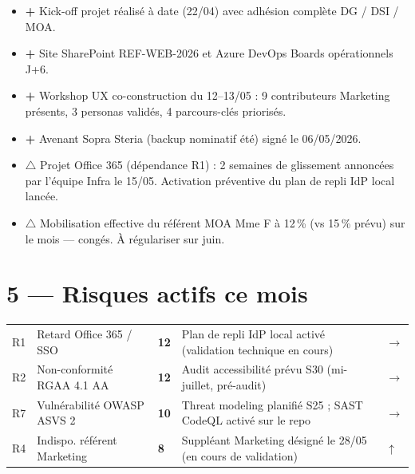 \documentclass[11pt,a4paper,oneside]{report}
\begin{document}
\begin{itemize}
  \item \textbf{+} Kick-off projet réalisé à date (22/04) avec adhésion complète DG / DSI / MOA.
  \item \textbf{+} Site SharePoint REF-WEB-2026 et Azure DevOps Boards opérationnels J+6.
  \item \textbf{+} Workshop UX co-construction du 12--13/05 : 9 contributeurs Marketing présents, 3 personas validés, 4 parcours-clés priorisés.
  \item \textbf{+} Avenant Sopra Steria (backup nominatif été) signé le 06/05/2026.
  \item \textbf{$\triangle$} Projet Office 365 (dépendance R1) : 2 semaines de glissement annoncées par l'équipe Infra le 15/05. Activation préventive du plan de repli IdP local lancée.
  \item \textbf{$\triangle$} Mobilisation effective du référent MOA Mme F à 12\,\% (vs 15\,\% prévu) sur le mois --- congés. À régulariser sur juin.
\end{itemize}

\section*{5 --- Risques actifs ce mois}

\renewcommand{\arraystretch}{1.3}
\begin{tabularx}{\textwidth}{C{0.6cm} L{4.5cm} C{1.5cm} L{5cm} C{1.5cm}}
\toprule
{}\th{\#} &  &  &  &  \\
\midrule
R1 & Retard Office 365 / SSO        & \textbf{12} & Plan de repli IdP local activé (validation technique en cours)   & $\rightarrow$ \\
R2 & Non-conformité RGAA 4.1 AA     & \textbf{12} & Audit accessibilité prévu S30 (mi-juillet, pré-audit)            & $\rightarrow$ \\
R7 & Vulnérabilité OWASP ASVS 2     & \textbf{10} & Threat modeling planifié S25 ; SAST CodeQL activé sur le repo   & $\rightarrow$ \\
R4 & Indispo. référent Marketing    & \textbf{8}  & Suppléant Marketing désigné le 28/05 (en cours de validation)   & $\uparrow$ \\
\bottomrule
\end{tabularx}
\end{document}
